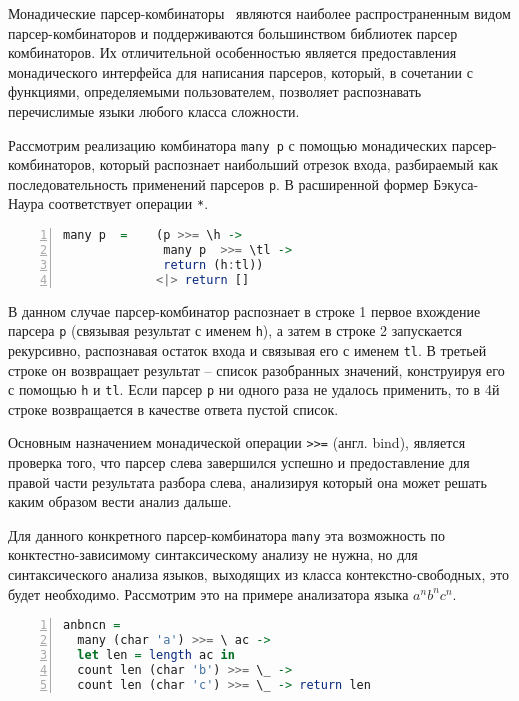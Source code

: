 Монадические парсер-комбинаторы~\cite{monparsing} являются наиболее распространенным видом парсер-комбинаторов и поддерживаются большинством библиотек парсер комбинаторов. Их отличительной особенностью является предоставления монадического интерфейса для написания парсеров, который, в сочетании с функциями, определяемыми пользователем, позволяет распознавать перечислимые языки любого класса сложности.

Рассмотрим реализацию комбинатора \verb=many p= с помощью монадических парсер-комбинаторов, который распознает наибольший отрезок входа, разбираемый как последовательность применений парсеров \verb=p=. В расширенной формер Бэкуса-Наура соответствует операции \verb=*=.

\begin{lstlisting}[language=haskell,numbers=left]
many p  =    (p >>= \h ->
              many p  >>= \tl ->
              return (h:tl))
             <|> return []
\end{lstlisting}

В данном случае парсер-комбинатор распознает в строке 1 первое вхождение парсера \verb=p= (связывая результат с именем \verb=h=), а затем в строке 2 запускается рекурсивно, распознавая остаток входа и связывая его с именем \verb=tl=.
В третьей строке он возвращает результат -- список разобранных значений, конструируя его с помощью \verb=h= и  \verb=tl=. Если парсер \verb=p= ни одного раза не удалось применить,  то в 4й строке возвращается в качестве ответа пустой список.

Основным назначением монадической операции \verb|>>=| (англ. bind), является проверка того, что парсер слева завершился успешно и предоставление для правой части результата разбора слева, анализируя который она может решать каким образом вести анализ дальше. 

Для данного конкретного парсер-комбинатора \verb=many= эта возможность по конктестно-зависимому синтаксическому анализу не нужна, но для синтаксического анализа языков, выходящих из класса контекстно-сво\-бодных, это будет необходимо. Рассмотрим это на примере анализатора языка $a^nb^nc^n$.

\begin{lstlisting}[language=haskell,numbers=left]
anbncn =
  many (char 'a') >>= \ ac ->
  let len = length ac in
  count len (char 'b') >>= \_ ->
  count len (char 'c') >>= \_ -> return len
\end{lstlisting}

